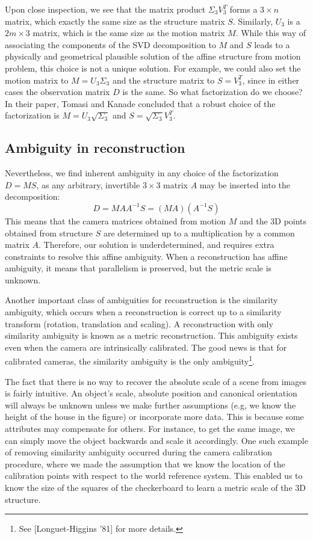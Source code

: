 \documentclass[a4paper, 12pt]{article}
\numberwithin{equation}{section}
\begin{document}
Upon close inspection, we see that the matrix product $\Sigma_3V_3^T$ forms a $3\times n$ matrix, which exactly the same size as the structure matrix $S$. Similarly, $U_3$ is a $2m\times 3$ matrix, which is the same size as the motion matrix $M$. While this way of associating the components of the SVD decomposition to $M$ and $S$ leads to a physically and geometrical plausible solution of the affine structure from motion problem, this choice is not a unique solution. For example, we could also set the motion matrix to $M = U_3\Sigma_3$ and the structure matrix to $S = V_3^T$, since in either cases the observation matrix $D$ is the same. So what factorization do we choose? In their paper, Tomasi and Kanade concluded that a robust choice of the factorization is $M = U_3\sqrt{\Sigma_3}$ and $S = \sqrt{\Sigma_3}V_3^T$.

\subsection{Ambiguity in reconstruction}
Nevertheless, we find inherent ambiguity in any choice of the factorization $D=MS$, as any arbitrary, invertible $3 \times 3$ matrix $A$ may be inserted into the decomposition:
\begin{equation}
    D = MAA^{-1}S = (MA)(A^{-1}S)
\end{equation}
This means that the camera matrices obtained from motion $M$ and the 3D points obtained from structure $S$ are determined up to a multiplication by a common matrix $A$. Therefore, our solution is underdetermined, and requires extra constraints to resolve this affine ambiguity. When a reconstruction has affine ambiguity, it means that parallelism is preserved, but the metric scale is unknown.

Another important class of ambiguities for reconstruction is the similarity ambiguity, which occurs when a reconstruction is correct up to a similarity transform (rotation, translation and  scaling). A reconstruction with only similarity ambiguity is known as a metric reconstruction. This ambiguity exists even when the camera are intrinsically calibrated.  The good news is that for calibrated cameras, the similarity ambiguity is the only ambiguity\footnote{See [Longuet-Higgins ’81] for more details.}. 

The fact that there is no way to recover the absolute scale of a scene from images is fairly intuitive. An object's scale, absolute position and canonical orientation will always be unknown unless we make further assumptions (e.g, we know the height of the house in the figure) or incorporate more data. This is because some attributes may compensate for others. For instance, to get the same image, we can simply move the object backwards and scale it accordingly. One such example of removing similarity ambiguity occurred during the camera calibration procedure, where we made the assumption that we know the location of the calibration points with respect to the world reference system. This enabled us to know the size of the squares of the checkerboard to learn a metric scale of the 3D structure.
\end{document}
